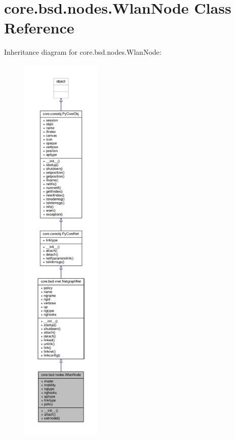 \hypertarget{classcore_1_1bsd_1_1nodes_1_1_wlan_node}{\section{core.\+bsd.\+nodes.\+Wlan\+Node Class Reference}
\label{classcore_1_1bsd_1_1nodes_1_1_wlan_node}
}


Inheritance diagram for core.\+bsd.\+nodes.\+Wlan\+Node\+:
\nopagebreak
\begin{figure}[H]
\begin{center}
\leavevmode
\includegraphics[height=550pt]{classcore_1_1bsd_1_1nodes_1_1_wlan_node__inherit__graph}
\end{center}
\end{figure}



